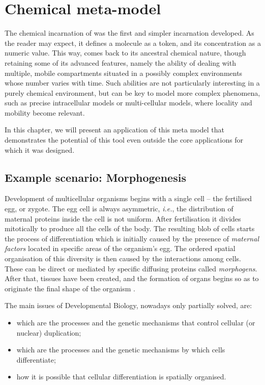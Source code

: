 \documentclass[12pt,a4paper,twoside,openright]{book}
\begin{document}
\chapter{Chemical meta-model}

The chemical incarnation of \alchemist{} was the first and simpler incarnation developed.
%
As the reader may expect, it defines a molecule as a token, and its concentration as a numeric value.
%
This way, \alchemist{} comes back to its ancestral chemical nature, though retaining some of its advanced features, namely the ability of dealing with multiple, mobile compartments situated in a possibly complex environments whose number varies with time.
%
Such abilities are not particularly interesting in a purely chemical environment, but can be key to model more complex phenomena, such as precise intracellular models or multi-cellular models, where locality and mobility become relevant.

In this chapter, we will present an application of this meta model that demonstrates the potential of this tool even outside the core applications for which it was designed.

\section{Example scenario: Morphogenesis}

Development of multicellular organisms begins with a single cell -- the fertilised egg, or zygote.
%
The egg cell is always asymmetric, \emph{i.e.}, the distribution of maternal proteins inside the cell is not uniform.
%
After fertilisation it divides mitotically to produce all the cells of the body. 
%
The resulting blob of cells starts the process of differentiation which is initially caused by the presence of \emph{maternal factors} located in specific areas of the organism's egg.
%
The ordered spatial organisation of this diversity is then caused by the interactions among cells. These can be direct or mediated by specific diffusing proteins called \emph{morphogens}. 
%
After that, tissues have been created, and the formation of organs begins so as to originate the final shape of the organism \cite{alberts, gilbert2006-devbio}. 

The main issues of Developmental Biology, nowadays only partially solved, are:
\begin{itemize}
 \item which are the processes and the genetic mechanisms that control cellular (or nuclear) duplication;
 \item which are the processes and the genetic mechanisms by which cells differentiate;
 \item how it is possible that cellular differentiation is spatially organised.
\end{itemize}
\end{document}
